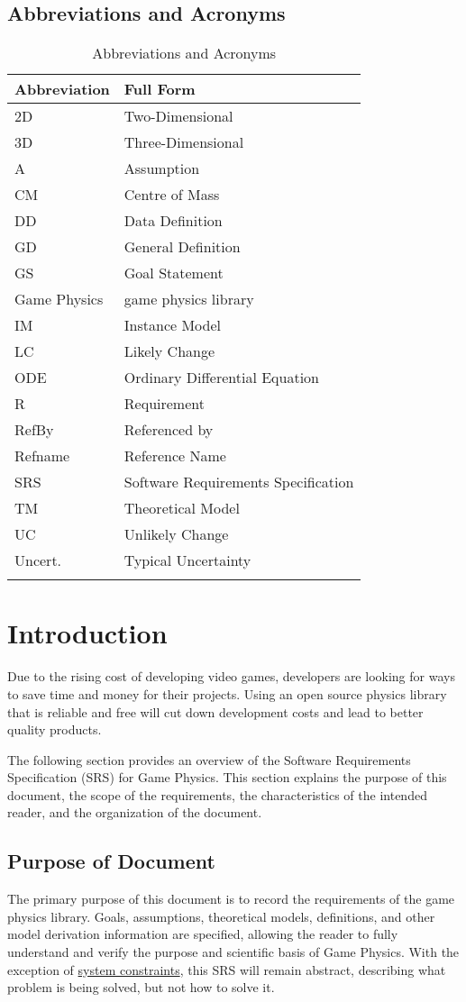 \documentclass[12pt]{article}
\begin{document}
\subsection{Abbreviations and Acronyms}
\label{Sec:TAbbAcc}
\begin{longtable}{l l}
\toprule
\textbf{Abbreviation} & \textbf{Full Form}
\\
\midrule
\endhead
2D & Two-Dimensional
\\
3D & Three-Dimensional
\\
A & Assumption
\\
CM & Centre of Mass
\\
DD & Data Definition
\\
GD & General Definition
\\
GS & Goal Statement
\\
Game Physics & game physics library
\\
IM & Instance Model
\\
LC & Likely Change
\\
ODE & Ordinary Differential Equation
\\
R & Requirement
\\
RefBy & Referenced by
\\
Refname & Reference Name
\\
SRS & Software Requirements Specification
\\
TM & Theoretical Model
\\
UC & Unlikely Change
\\
Uncert. & Typical Uncertainty
\\
\bottomrule
\caption{Abbreviations and Acronyms}
\label{Table:TAbbAcc}
\end{longtable}
\section{Introduction}
\label{Sec:Intro}
Due to the rising cost of developing video games, developers are looking for ways to save time and money for their projects. Using an open source physics library that is reliable and free will cut down development costs and lead to better quality products.

The following section provides an overview of the Software Requirements Specification (SRS) for Game Physics. This section explains the purpose of this document, the scope of the requirements, the characteristics of the intended reader, and the organization of the document.

\subsection{Purpose of Document}
\label{Sec:DocPurpose}
The primary purpose of this document is to record the requirements of the game physics library. Goals, assumptions, theoretical models, definitions, and other model derivation information are specified, allowing the reader to fully understand and verify the purpose and scientific basis of Game Physics. With the exception of \hyperref[Sec:SysConstraints]{system constraints}, this SRS will remain abstract, describing what problem is being solved, but not how to solve it.
\end{document}
